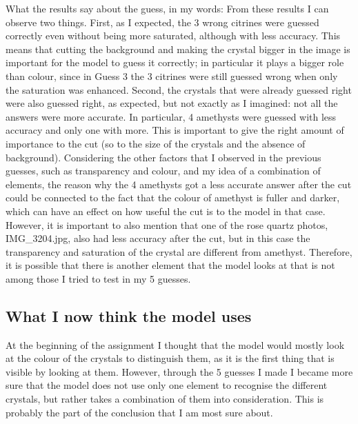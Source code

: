 \documentclass[11pt]{article}
\begin{document}
What the results say about the guess, in my words: From these results I can
observe two things. First, as I expected, the 3 wrong citrines were guessed
correctly even without being more saturated, although with less accuracy. This
means that cutting the background and making the crystal bigger in the image is
important for the model to guess it correctly; in particular it plays a bigger
role than colour, since in Guess 3 the 3 citrines were still guessed wrong when
only the saturation was enhanced. Second, the crystals that were already guessed
right were also guessed right, as expected, but not exactly as I imagined: not
all the answers were more accurate. In particular, 4 amethysts were guessed with
less accuracy and only one with more. This is important to give the right amount
of importance to the cut (so to the size of the crystals and the absence of
background). Considering the other factors that I observed in the previous
guesses, such as transparency and colour, and my idea of a combination of
elements, the reason why the 4 amethysts got a less accurate answer after the
cut could be connected to the fact that the colour of amethyst is fuller and
darker, which can have an effect on how useful the cut is to the model in that
case. However, it is important to also mention that one of the rose quartz
photos, IMG\_3204.jpg, also had less accuracy after the cut, but in this case
the transparency and saturation of the crystal are different from amethyst.
Therefore, it is possible that there is another element that the model looks at
that is not among those I tried to test in my 5 guesses.

\subsection*{What I now think the model uses}
At the beginning of the assignment I thought that the model would mostly look at
the colour of the crystals to distinguish them, as it is the first thing that is
visible by looking at them. However, through the 5 guesses I made I became more
sure that the model does not use only one element to recognise the different
crystals, but rather takes a combination of them into consideration. This is
probably the part of the conclusion that I am most sure about.
\end{document}
